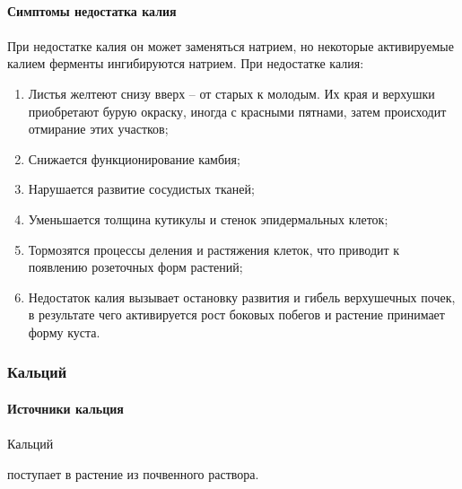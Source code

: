 \paragraph*{Симптомы недостатка калия}
 
\paragraph*{}При недостатке калия он может заменяться натрием, но некоторые активируемые калием ферменты ингибируются натрием. При недостатке калия:

\begin{enumerate}

\item Листья желтеют снизу вверх -- от старых к молодым. Их края и верхушки приобретают бурую окраску, иногда с красными пятнами, затем происходит отмирание этих участков;
\item Снижается функционирование камбия;
\item Нарушается развитие сосудистых тканей;
\item Уменьшается толщина кутикулы и стенок эпидермальных клеток;
\item Тормозятся процессы деления и растяжения клеток, что приводит к появлению розеточных форм растений;
\item Недостаток калия вызывает остановку развития и гибель верхушечных почек, в результате чего активируется рост боковых побегов и растение принимает форму куста.

\end{enumerate}


\subsubsection*{Кальций}

\paragraph*{Источники кальция}

\paragraph*{}\hypertarget{calcium}{Кальций} поступает в растение из почвенного раствора. 

